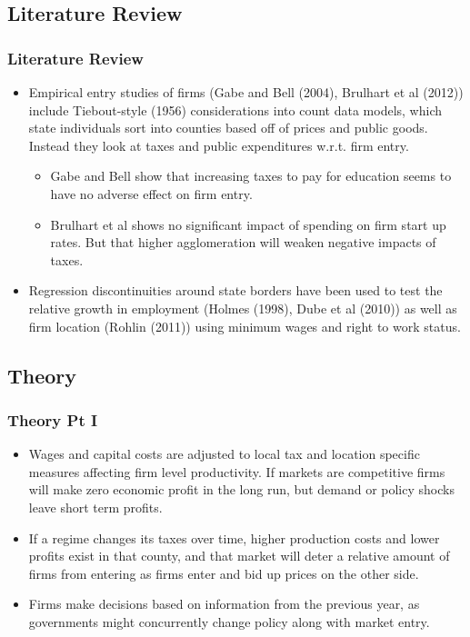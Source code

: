\documentclass{beamer}
\begin{document}
\begin{frame}
\section{Literature Review}
\frametitle{Literature Review}
\begin{itemize}
\item Empirical entry studies of firms (Gabe and Bell (2004), Brulhart et al (2012)) include Tiebout-style (1956) considerations into count data models, which state individuals sort into counties based off of prices and public goods. Instead they look at taxes and public expenditures w.r.t. firm entry.
\begin{itemize}
\item Gabe and Bell show that increasing taxes to pay for education seems to have no adverse effect on firm entry.
\item Brulhart et al shows no significant impact of spending on firm start up rates. But that higher agglomeration will weaken negative impacts of taxes.
\end{itemize}
\item Regression discontinuities around state borders have been used to test the relative growth in employment (Holmes (1998), Dube et al (2010)) as well as firm location (Rohlin (2011)) using minimum wages and right to work status.
\end{itemize}
\end{frame}

\begin{frame}
\section{Theory}
\frametitle{Theory Pt I}
\begin{itemize}
\item  Wages and capital costs are adjusted to local tax and location specific measures affecting firm level productivity. If markets are competitive firms will make zero economic profit in the long run, but demand or policy shocks leave short term profits.
\item If a regime changes its taxes over time, higher production costs and lower profits exist in that county, and that market will deter a relative amount of firms from entering as firms enter and bid up prices on the other side.
\item Firms make decisions based on information from the previous year, as governments might concurrently change policy along with market entry. 
\end{itemize}
\end{frame}
\end{document}
